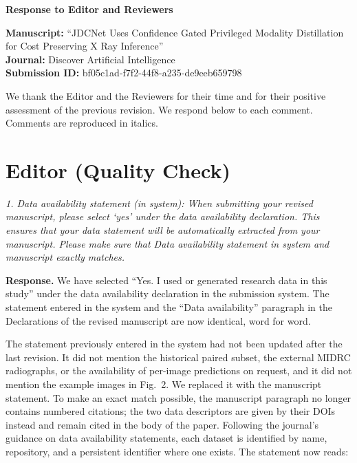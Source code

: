 \documentclass[11pt]{article}
\newenvironment{rcomment}{\par\noindent\begin{minipage}{\linewidth}\itshape\color{black!75}}{\end{minipage}\par}
\begin{document}
\sloppy

\begin{center}
{\LARGE\bfseries Response to Editor and Reviewers}
\end{center}

\noindent\textbf{Manuscript:} ``JDCNet Uses Confidence Gated Privileged Modality Distillation for Cost Preserving X Ray Inference''\\
\textbf{Journal:} Discover Artificial Intelligence\\
\textbf{Submission ID:} bf05c1ad-f7f2-44f8-a235-de9eeb659798

We thank the Editor and the Reviewers for their time and for their positive
assessment of the previous revision. We respond below to each comment.
Comments are reproduced in italics.

\hrulefill

\section*{Editor (Quality Check)}

\begin{rcomment}
1. Data availability statement (in system): When submitting your revised
manuscript, please select `yes' under the data availability declaration. This
ensures that your data statement will be automatically extracted from your
manuscript. Please make sure that Data availability statement in system and
manuscript exactly matches.
\end{rcomment}

\textbf{Response.} We have selected ``Yes. I used or generated research data
in this study'' under the data availability declaration in the submission
system. The statement entered in the system and the ``Data availability''
paragraph in the Declarations of the revised manuscript are now identical,
word for word.

The statement previously entered in the system had not been updated after the
last revision. It did not mention the historical paired subset, the external
MIDRC radiographs, or the availability of per-image predictions on request,
and it did not mention the example images in Fig.~2. We replaced it with the
manuscript statement. To make an exact match possible, the manuscript
paragraph no longer contains numbered citations; the two data descriptors are
given by their DOIs instead and remain cited in the body of the paper.
Following the journal's guidance on data availability statements, each
dataset is identified by name, repository, and a persistent identifier where
one exists. The statement now reads:
\end{document}
